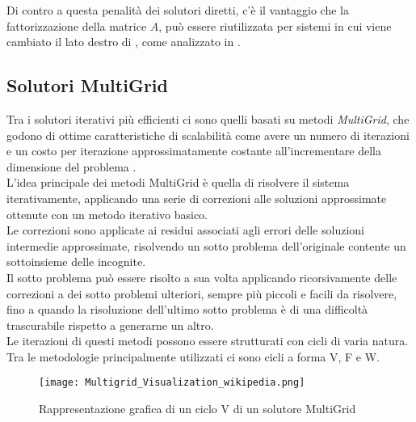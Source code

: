 Di contro a questa penalità dei solutori diretti, c'è il vantaggio che la fattorizzazione della matrice $A$, 
può essere riutilizzata per sistemi in cui viene cambiato il lato destro di ,
come analizzato in .\\
\voidLine
\subsection{Solutori MultiGrid} \label{multiGrid}
Tra i solutori iterativi più efficienti ci sono quelli basati su metodi \emph{MultiGrid}, 
che godono di ottime caratteristiche di scalabilità come avere un numero di iterazioni e 
un costo per iterazione approssimatamente costante all'incrementare della dimensione del problema { \bf {}}.\\
L'idea principale dei metodi MultiGrid è quella di 
risolvere il sistema  iterativamente, applicando una serie di correzioni 
alle soluzioni approssimate ottenute con un metodo iterativo basico.\\
Le correzioni sono applicate ai residui associati agli errori delle soluzioni intermedie approssimate,
risolvendo un sotto problema dell'originale contente un sottoinsieme delle incognite.\\ %
Il sotto problema può essere risolto a sua volta applicando ricorsivamente delle correzioni
a dei sotto problemi ulteriori, sempre più piccoli e facili da risolvere,
fino a quando la risoluzione dell'ultimo sotto problema è di una difficoltà trascurabile 
rispetto a generarne un altro.\\
\voidLine
Le iterazioni di questi metodi possono essere strutturati con cicli di varia natura.
Tra le metodologie principalmente utilizzati ci sono cicli a forma V, F e W.\\
\begin{figure}[H]
  \centering \texttt{[image: Multigrid\_Visualization\_wikipedia.png]}
  \caption[ciclo V di un Multigrid] {Rappresentazione grafica di un ciclo V di un solutore MultiGrid}
  \decoRule \label{fig:Multigrid_Visualization_wikipedia}
\end{figure}

